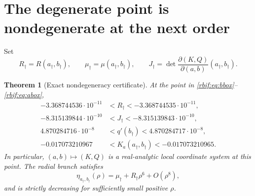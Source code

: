 \documentclass[11pt,a4paper]{article}
\newtheorem{theorem}{Theorem}[section]
\theoremstyle{definition}\newtheorem{definition}[theorem]{Definition}
\theoremstyle{remark}\newtheorem{remark}[theorem]{Remark}
\newcommand{\rbpa}{a_\dagger}
\newcommand{\rbpb}{b_\dagger}
\newcommand{\rbrr}{R_\dagger}
\newcommand{\rbmu}{\mu_\dagger}
\numberwithin{equation}{section}
\begin{document}
\section{The degenerate point is nondegenerate at the next order}
\label{rbif:sec:point}
Set
\[
 \rbrr=R(\rbpa,\rbpb),\qquad \rbmu=\mu(\rbpa,\rbpb),\qquad
 J_\dagger=\det\frac{\partial(K,Q)}{\partial(a,b)}(\rbpa,\rbpb).
\]
\begin{theorem}[Exact nondegeneracy certificate]
\label{rbif:thm:nondeg}
At the point in \eqref{rbif:eq:bbox}--\eqref{rbif:eq:abox},
\begin{align}
 -3.368744536\cdot10^{-11}&<\rbrr<-3.368744535\cdot10^{-11},
 \label{rbif:eq:Rbox}\\
 -8.315139844\cdot10^{-10}&<J_\dagger<-8.315139843\cdot10^{-10},
 \label{rbif:eq:Jbox}\\
 4.870284716\cdot10^{-8}&<q'(\rbpb)<4.870284717\cdot10^{-8},
 \label{rbif:eq:qpbox}\\
 -0.017073210967&<K_a(\rbpa,\rbpb)<-0.017073210965.
 \label{rbif:eq:Kabox}
\end{align}
In particular, $(a,b)\mapsto(K,Q)$ is a real-analytic local coordinate
system at this point. The radial branch satisfies
\begin{equation}
 \eta_{\rbpa,\rbpb}(\rho)=\rbmu+\rbrr\rho^6+O(\rho^8),
 \label{rbif:eq:degexp}
\end{equation}
and is strictly decreasing for sufficiently small positive $\rho$.
\end{theorem}
\end{document}
